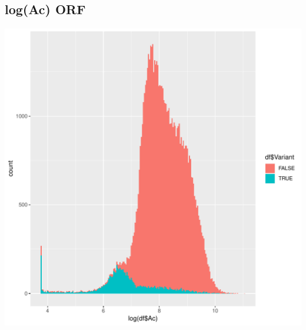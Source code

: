 \documentclass{article}\usepackage[]{graphicx}\usepackage[]{color}
\newenvironment{knitrout}{}{} %
\begin{document}
\subsection{log(Ac) ORF}
\begin{knitrout}
\color{fgcolor}

{\centering \includegraphics[width=1\linewidth]{figure/minimal-dens_ORF-1} 

}



\end{knitrout}
\clearpage
\end{document}
